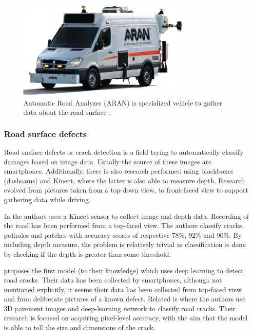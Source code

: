 \begin{figure}[h!]
\begin{center}
\includegraphics[height=5cm,keepaspectratio]{images/2_literature/aran.png}
\end{center}
\caption{Automatic Road Analyzer (ARAN) is specialized vehicle to gather data about the road surface \cite{Gupta2020}.}
\end{figure}

\subsubsection{Road surface defects}
Road surface defects or crack detection is a field trying to automatically classify damages based on image data. Usually the source of these images are smartphones. Additionally, there is also research performed using blackboxes (dashcams) and Kinect, where the latter is also able to measure depth. Research evolved from pictures taken from a top-down view, to front-faced view to support gathering data while driving.

In  the authors uses a Kinect sensor to collect image and depth data. Recording of the road has been performed from a top-faced view. The authors classify cracks, potholes and patches with accuracy scores of respective 78\%, 92\% and 90\%. By including depth measure, the problem is relatively trivial as classification is done by checking if the depth is greater than some threshold. 

 proposes the first model (to their knowledge) which uses deep learning to detect road cracks. Their data has been collected by smartphones, although not mentioned explicitly, it seems their data has been collected from top-faced view and from deliberate pictures of a known defect. Related is  where the authors use 3D pavement images and deep-learning network to classify road cracks. Their research is focused on acquiring pixel-level accuracy, with the aim that the model is able to tell the size and dimensions of the crack.


